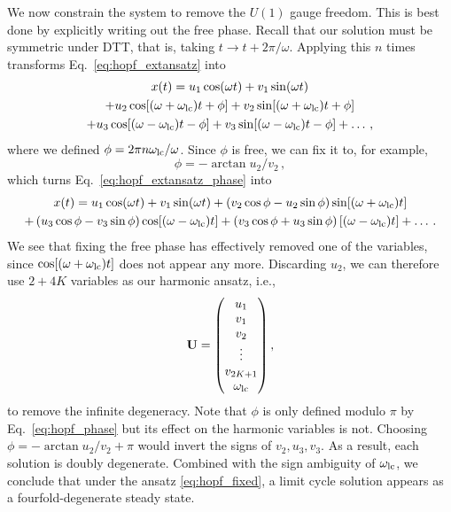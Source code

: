 We now constrain the system to remove the $U(1)$ gauge freedom. This is best done by explicitly writing out the free phase. Recall that our solution must be symmetric under DTT, that is, taking $t \rightarrow t + 2\pi/\omega$. Applying this $n$ times transforms Eq.~\eqref{eq:hopf_extansatz} into
\begin{multline} \label{eq:hopf_extansatz_phase}
x(t) = u_1 \cos(\omega t) + v_1 \sin(\omega t) 
\\ +  u_2 \cos[(\omega + \omega_{\rm lc}) t + \phi] + v_2 \sin[(\omega + \omega_{\rm lc}) t + \phi] 
\\ + u_3 \cos[(\omega - \omega_{\rm lc}) t - \phi] + v_3 \sin[(\omega - \omega_{\rm lc}) t - \phi]+ \ldots \,,
\end{multline}
where we defined $\phi = 2\pi n \omega_{\rm lc} / \omega$. Since $\phi$ is free, we can fix it to, for example,
\begin{equation} \label{eq:hopf_phase}
\phi = -\arctan{u_2/v_2}\,,
\end{equation}
which turns Eq.~\eqref{eq:hopf_extansatz_phase} into
\begin{multline}
x(t) = u_1 \cos(\omega t) + v_1 \sin(\omega t) + \left( v_2 \cos{\phi} - u_2 \sin{\phi} \right) \sin[(\omega + \omega_{\rm lc}) t] \\ 
+ \left( u_3 \cos{\phi} - v_3 \sin{\phi} \right) \cos[(\omega - \omega_{\rm lc}) t]  + \left(v_3 \cos{\phi} + u_3 \sin{\phi} \right) [(\omega - \omega_{\rm lc}) t]  + \ldots \,. 
\end{multline}
We see that fixing the free phase has effectively removed one of the variables, since $\cos[(\omega + \omega_{\rm lc}) t]$ does not appear any more. Discarding $u_2$, we can therefore use $2+4K$ variables as our harmonic ansatz, i.e.,
\begin{equation} \label{eq:hopf_fixed}
\vb{U}= \mqty(u_1 \\ v_1 \\ v_2 \\ \vdots \\ v_{2K+1} \\ \omega_{\rm lc}) \,,
\end{equation}
to remove the infinite degeneracy. Note that $\phi$ is only defined modulo $\pi$ by Eq.~\eqref{eq:hopf_phase} but its effect on the harmonic variables is not. Choosing $\phi = -\arctan{u_2/v_2} + \pi$ would invert the signs of $v_2, u_3, v_3$. As a result, each solution is doubly degenerate. Combined with the sign ambiguity of $\omega_{\rm lc}$, we conclude that under the ansatz \eqref{eq:hopf_fixed}, a limit cycle solution appears as a fourfold-degenerate steady state.

